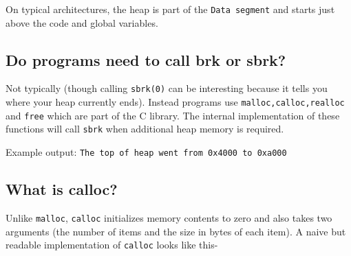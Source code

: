 On typical architectures, the heap is part of the \texttt{Data\ segment}
and starts just above the code and global variables.

\subsection{Do programs need to call brk or
sbrk?}\label{do-programs-need-to-call-brk-or-sbrk}

Not typically (though calling \texttt{sbrk(0)} can be interesting
because it tells you where your heap currently ends). Instead programs
use \texttt{malloc,calloc,realloc} and \texttt{free} which are part of
the C library. The internal implementation of these functions will call
\texttt{sbrk} when additional heap memory is required.

\begin{Shaded}
\end{Shaded}

Example output:
\texttt{The\ top\ of\ heap\ went\ from\ 0x4000\ to\ 0xa000}

\subsection{What is calloc?}\label{what-is-calloc}

Unlike \texttt{malloc}, \texttt{calloc} initializes memory contents to
zero and also takes two arguments (the number of items and the size in
bytes of each item). A naive but readable implementation of
\texttt{calloc} looks like this-

\begin{Shaded}
\begin{Highlighting}[]
 
\NormalTok{\{}
     
    
      
    

     
\NormalTok{\}}
\end{Highlighting}
\end{Shaded}

